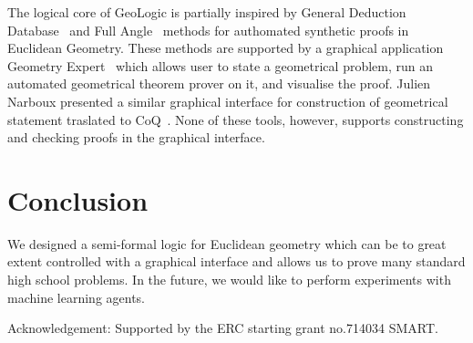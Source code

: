 \documentclass[runningheads]{llncs}
\begin{document}
The logical core of GeoLogic is partially inspired by General
Deduction Database~\cite{GDD} and Full Angle~\cite{FullAngle} methods for authomated synthetic proofs in
Euclidean Geometry.
These methods are supported by a graphical application
Geometry Expert~\cite{GEX} which allows user to state a
geometrical problem, run an automated geometrical theorem prover on
it, and visualise the proof.
Julien Narboux presented a similar graphical interface for
construction of geometrical statement traslated to
CoQ~\cite{GeoProof}.
None of these tools, however, supports constructing and checking
proofs in the graphical interface.

\section{Conclusion}

We designed a semi-formal logic for Euclidean geometry which can be to
great extent controlled with a graphical interface and allows us
to prove many standard high school problems. In the future, we would
like to perform experiments with machine learning agents.

Acknowledgement: Supported by the ERC starting grant no.714034 SMART.
\end{document}
